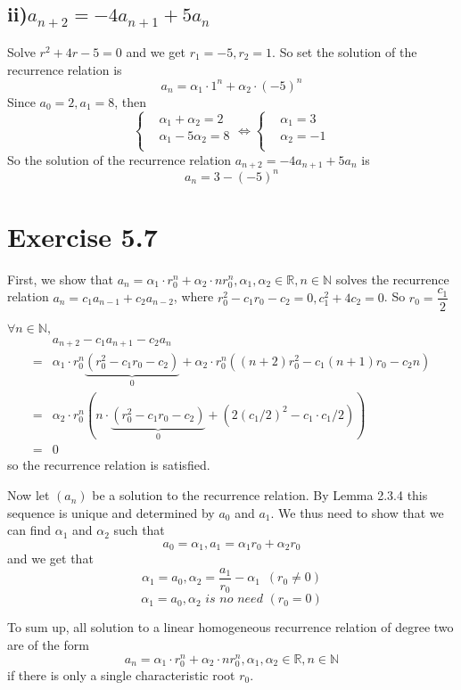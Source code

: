 \documentclass[a4paper,12pt,titlepage]{article}
\begin{document}
\subsection*{ii)$a_{n+2}=-4a_{n+1}+5a_{n}$}
Solve $r^2+4r-5=0$ and we get $r_1=-5,r_2=1$. So set the solution of the recurrence relation is
$$a_n=\alpha_1 \cdot 1^n+\alpha_2\cdot(-5)^n$$
Since $a_0=2,a_1=8$, then
$$\left\{
\begin{aligned}
&\alpha_1+\alpha_2=2\\
&\alpha_1-5\alpha_2=8\\
\end{aligned}
\right.\Leftrightarrow \left\{
\begin{aligned}
&\alpha_1=3\\
&\alpha_2=-1\\
\end{aligned}
\right. $$	
So the solution of the recurrence relation $a_{n+2}=-4a_{n+1}+5a_{n}$ is
$$a_n=3-(-5)^n$$


\section*{Exercise 5.7}

First, we show that $a_n=\alpha_1\cdot r_0^n+\alpha_2\cdot nr_0^n,\alpha_1,\alpha_2\in\mathbb{R},n\in\mathbb{N}$ solves the recurrence relation $a_n=c_1a_{n-1}+c_2a_{n-2}$, where $r_0^2-c_1r_0-c_2=0,c_1^2+4c_2=0$. So $r_0=\dfrac{c_1}{2}$

$\forall n\in\mathbb{N},$
\begin{align*}
&a_{n+2}-c_1a_{n+1}-c_2a_n\\
=&\alpha_1\cdot r_0^n\underbrace{(r_0^2-c_1r_0-c_2)}_0+\alpha_2\cdot r_0^n((n+2)r_0^2-c_1(n+1)r_0-c_2n)\\
=&\alpha_2\cdot r_0^n(n\cdot\underbrace{(r_0^2-c_1r_0-c_2)}_0+(2(c_1/2)^2-c_1\cdot c_1/2))\\
=&0
\end{align*}
so the recurrence relation is satisfied.

Now let $(a_n)$ be a solution to the recurrence relation. By Lemma 2.3.4 this sequence is unique and determined by $a_0$ and $a_1$. We thus need to show that we can find $\alpha_1$ and $\alpha_2$ such that
$$a_0=\alpha_1,a_1=\alpha_1r_0+\alpha_2r_0$$
and we get that 
$$\alpha_1=a_0,\alpha_2=\dfrac{a_1}{r_0}-\alpha_1\,\,\,(r_0\neq0)$$
$$\alpha_1=a_0,\alpha_2\,\,is\,\,no\,\,need\,\,(r_0=0)$$

To sum up, all solution to a linear homogeneous recurrence relation of degree two are of the form
$$a_n=\alpha_1\cdot r_0^n+\alpha_2\cdot nr_0^n,\alpha_1,\alpha_2\in\mathbb{R},n\in\mathbb{N}$$
if there is only a single characteristic root $r_0$.
\end{document}
